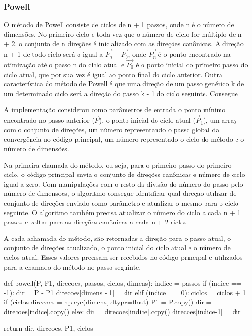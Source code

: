 \documentclass[10pt, a4paper]{article}
\begin{document}
\subsubsection{Powell}

O método de Powell consiste de ciclos de n + 1 passos, onde n é o número de dimensões. No primeiro ciclo e toda vez que o número do ciclo for múltiplo de n + 2, 
o conjunto de n direções é inicializado com as direções canônicas. A direção n + 1 de todo ciclo será o igual a  $\overrightarrow{P_n} - \overrightarrow{P_0}$, 
onde $\overrightarrow{P_n}$ é o ponto encontrado na otimização até o passo n do ciclo atual e $\overrightarrow{P_0}$ é o ponto inicial do primeiro passo do ciclo atual,
que por sua vez é igual ao ponto final do ciclo anterior. Outra característica do método de Powell é que uma direção de um passo genérico k de um determinado ciclo será 
a direção do passo k - 1 do ciclo seguinte. Consegue

A implementação considerou como parâmetros de entrada o ponto mínimo encontrado no passo anterior ($\overrightarrow{P}$), o ponto inicial do 
ciclo atual ($\overrightarrow{P}_1$), um array com o conjunto de direções, um número representando o passo global da convergência
no código principal, um número representado o ciclo do método e o número de dimensões.

Na primeira chamada do método, ou seja, para o primeiro passo do primeiro ciclo, o código principal envia o conjunto de direções canônicas e número de ciclo igual a zero.
Com manipulações com o resto da divisão do número do passo pelo número de dimensões, o algoritmo consegue identificar qual direção utilizar do conjunto de direções
enviado como parâmetro e atualizar o mesmo para o ciclo seguinte. O algoritmo também precisa atualizar o número do ciclo a cada n + 1 passos e voltar para as direções
canônicas a cada n + 2 ciclos.  

A cada achamada do método, são retornadas a direção para o passo atual, o conjunto de direções atualizado, o ponto inicial do ciclo atual  e o número de ciclos atual.
Esses valores precisam ser recebidos no código principal e utilizados para a chamado do método no passo seguinte.

\begin{python}
  def powell(P, P1, direcoes, passos, ciclos, dimens):
    indice = passos%
    if (indice == -1):
        dir = P - P1
        direcoes[dimens - 1] = dir        
    elif (indice == 0):
        ciclos = ciclos + 1
        if (ciclos%
            direcoes = np.eye(dimens, dtype=float)
        P1 = P.copy()
        dir = direcoes[indice].copy()
    else:
        dir = direcoes[indice].copy()
        direcoes[indice-1] = dir
  
    return dir, direcoes, P1, ciclos 
\end{python}
\end{document}

